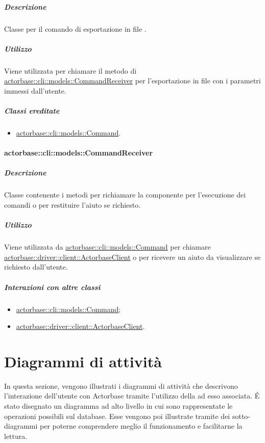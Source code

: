 \documentclass{scalatekids-article}
\begin{document}
\subparagraph{Descrizione}

Classe per il comando di esportazione in file .

\subparagraph{Utilizzo}

Viene utilizzata per chiamare il metodo di
\hyperref[sec:actorbase::cli::models::CommandReceiver]{actorbase::cli::models::CommandReceiver} per l'esportazione in file
 con i parametri immessi dall'utente.

\subparagraph{Classi ereditate}

\begin{itemize}
\item \hyperref[sec:actorbase::cli::models::Command]{actorbase::cli::models::Command}.
\end{itemize}

\paragraph{actorbase::cli::models::CommandReceiver}
\label{sec:actorbase::cli::models::CommandReceiver}

\subparagraph{Descrizione}

Classe contenente i metodi per richiamare la componente  per
l'esecuzione dei comandi o per restituire l'aiuto se richiesto.

\subparagraph{Utilizzo}

Viene utilizzata da \hyperref[sec:actorbase::cli::models::Command]{actorbase::cli::models::Command} per chiamare
\hyperref[sec:actorbase::driver::client::ActorbaseClient]{actorbase::driver::client::ActorbaseClient} o per ricevere un aiuto da
visualizzare se richiesto dall'utente.

\subparagraph{Interazioni con altre classi}

\begin{itemize}
\item \hyperref[sec:actorbase::cli::models::Command]{actorbase::cli::models::Command};
\item \hyperref[sec:actorbase::driver::client::ActorbaseClient]{actorbase::driver::client::ActorbaseClient}.
\end{itemize}

\section{Diagrammi di attività}

In questa sezione, vengono illustrati i diagrammi di attività che descrivono
l'interazione dell'utente con Actorbase tramite l'utilizzo della 
ad esso associata.  É stato disegnato un diagramma ad alto livello in cui sono
rappresentate le operazioni possibili sul database. Esse vengono poi
illustrate tramite dei sotto-diagrammi per poterne comprendere meglio il
funzionamento e facilitarne la lettura.
\end{document}
